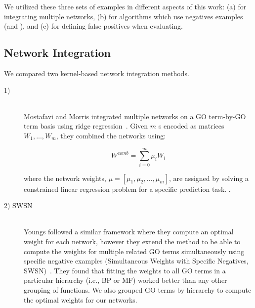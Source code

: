 We utilized these three sets of examples in different aspects of this work: (a) for integrating multiple networks, (b) for algorithms which use negatives examples (\sinksource and \genemania), and (c) for defining false positives when evaluating. 


\subsection{Network Integration}
\label{sec:network-integration}
We compared two kernel-based network integration methods.
\begin{description}
\item[1) ] \hfill \\
Mostafavi and Morris integrated multiple networks on a GO term-by-GO term basis using ridge regression~\cite{mostafavi-morris-genemania-gb-2008}. %
Given $m$ \FLN{}s encoded as matrices $W_{1},...,W_{m}$, they combined the networks using:

\begin{equation*}
    W^{comb} = \sum\limits_{i=0}^{m} \mu_{i}W_{i}
\end{equation*}

where the network weights, $\mu = [\mu_1, \mu_2, ..., \mu_m]$, are assigned by solving a constrained linear regression problem for a specific prediction task. 
.

\item[2) SWSN] \hfill \\
Youngs \etal followed a similar framework where they compute an optimal weight for each network, however they extend the method to be able to compute the weights for multiple related GO terms simultaneously using specific negative examples (Simultaneous Weights with Specific Negatives, SWSN)~\cite{youngs-bonneau-better-negatives-pfp-bioinfo-2013}. 
They found that fitting the weights to all GO terms in a particular hierarchy (i.e., BP or MF) worked better than any other grouping of functions. 
We also grouped GO terms by hierarchy to compute the optimal weights for our networks.

\end{description}
